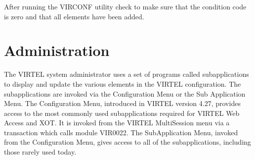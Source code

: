 \documentclass[letterpaper,10pt,english]{sphinxmanual}
\begin{document}
\begin{sphinxVerbatim}[commandchars=\\\{\}]
                                                     
                             
                                                        
                                                      
                                                          
                                                            
                                                   
                                                       
                                                           
                                                         
                                                         
\end{sphinxVerbatim}

\sphinxAtStartPar
{}

\sphinxAtStartPar
After running the VIRCONF utility check to make sure that the condition code is zero and that all elements have been added.

\newpage

\ignorespaces 

\section{Administration}
\label{\detokenize{connectivity_guide:administration}}\label{\detokenize{connectivity_guide:index-0}}
\sphinxAtStartPar
The VIRTEL system administrator uses a set of programs called sub\sphinxhyphen{}applications to display and update the various elements in the VIRTEL configuration. The sub\sphinxhyphen{}applications are invoked via the Configuration Menu or the Sub\sphinxhyphen{} Application Menu. The Configuration Menu, introduced in VIRTEL version 4.27, provides access to the most commonly\sphinxhyphen{} used sub\sphinxhyphen{}applications required for VIRTEL Web Access and XOT. It is invoked from the VIRTEL Multi\sphinxhyphen{}Session menu via a transaction which calls module VIR0022. The Sub\sphinxhyphen{}Application Menu,
invoked from the Configuration Menu, gives access to all of the sub\sphinxhyphen{}applications, including those rarely used today.
\end{document}
